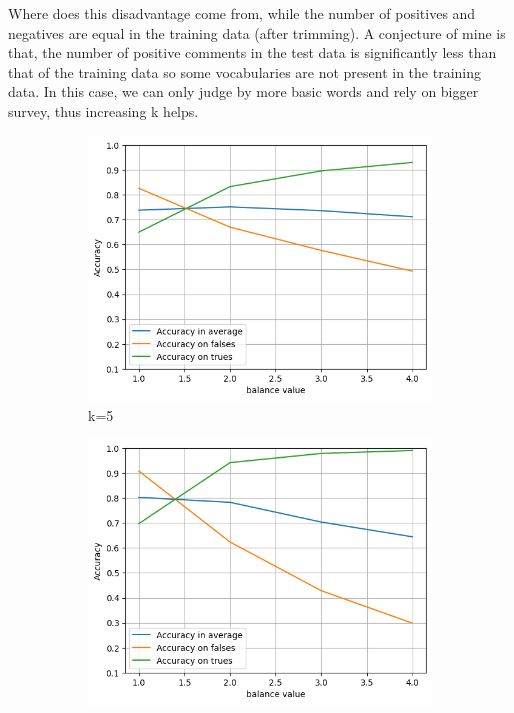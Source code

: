 \documentclass{article}
\begin{document}
Where does this disadvantage come from, while the number
of positives and negatives are equal in the training data (after trimming).
A conjecture of mine is that, the number of positive comments in the test data
is significantly less than that of the training data so
some vocabularies are not present in the training data. In this case,
we can only judge by more basic words and rely on bigger survey, thus increasing k helps.

\begin{figure}[htbp]
  \centering
  \begin{subfigure}[t]{0.33\textwidth}
    \centering
    \includegraphics[width=\linewidth]{balancek5.png}
    \caption{k=5}
  \end{subfigure}%
  \hfill
  \begin{subfigure}[t]{0.33\textwidth}
    \centering
    \includegraphics[width=\linewidth]{balancek50.png}

\end{subfigure}
\end{figure}
\end{document}

